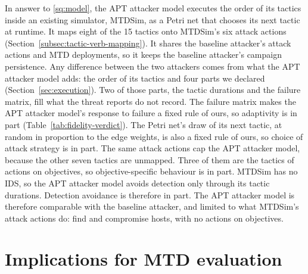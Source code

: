 \documentclass{cshonours}
\begin{document}
In answer to \ref{sq:model}, the APT attacker model executes the order of its
tactics inside an existing simulator, MTDSim, as a Petri net that chooses its
next tactic at runtime. It maps eight of the 15 tactics onto MTDSim's six
attack actions
(Section~\ref{subsec:tactic-verb-mapping}). It shares the baseline attacker's
attack actions and MTD deployments, so it keeps the baseline attacker's
campaign persistence. Any difference between the two attackers comes from
what the APT attacker model adds: the order of its tactics and four parts we
declared (Section~\ref{sec:execution}). Two of those parts, the tactic
durations and the failure matrix, fill what the threat reports do not record.
The failure matrix makes the APT attacker model's response to failure a fixed rule of ours, so
adaptivity is in part (Table~\ref{tab:fidelity-verdict}). The Petri net's
draw of its next tactic, at random in proportion to the edge weights, is also
a fixed rule of ours, so choice of attack strategy is in part. The same attack
actions cap the APT attacker model, because the other seven tactics are
unmapped. Three of them are the tactics
of actions on objectives, so objective-specific behaviour is in part. MTDSim
has no IDS, so the APT attacker model avoids detection only through
its tactic durations. Detection avoidance is therefore in part. The APT attacker model is therefore comparable with the baseline
attacker, and limited to what MTDSim's attack actions do: find and compromise
hosts, with no actions on objectives.

\section{Implications for MTD evaluation}
\label{sec:evaluation-implications}
\end{document}
